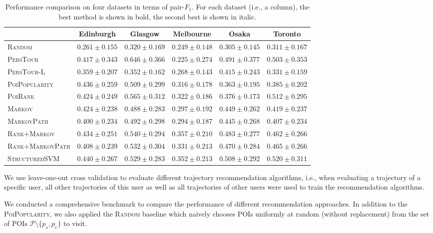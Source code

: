 \begin{table}[t]
\caption{Performance comparison on four datasets in terms of pair-$F_1$.
         For each dataset (i.e., a column), the best method is shown in bold, the second best is shown in italic.}
\label{tab:pairf1}
\centering
\begin{tabular}{l|ccccc} \hline
 & Edinburgh & Glasgow & Melbourne & Osaka & Toronto \\ \hline
\textsc{Random} & $0.261\pm0.155$ & $0.320\pm0.169$ & $0.249\pm0.148$ & $0.305\pm0.145$ & $0.311\pm0.167$ \\
\textsc{PersTour}\cite{ijcai15} & $0.417\pm0.343$ & $\mathbf{0.646\pm0.366}$ & $0.225\pm0.274$ & $\mathit{0.491\pm0.377}$ & $0.503\pm0.353$ \\
\textsc{PersTour-L} & $0.359\pm0.207$ & $0.352\pm0.162$ & $0.268\pm0.143$ & $0.415\pm0.243$ & $0.331\pm0.159$ \\
\textsc{PoiPopularity} & $\mathit{0.436\pm0.259}$ & $0.509\pm0.299$ & $0.316\pm0.178$ & $0.363\pm0.195$ & $0.385\pm0.202$ \\
\textsc{PoiRank} & $0.424\pm0.249$ & $\mathit{0.565\pm0.312}$ & $0.322\pm0.186$ & $0.376\pm0.173$ & $\mathit{0.512\pm0.295}$ \\
\textsc{Markov} & $0.424\pm0.238$ & $0.488\pm0.283$ & $0.297\pm0.192$ & $0.449\pm0.262$ & $0.419\pm0.237$ \\
\textsc{MarkovPath} & $0.400\pm0.234$ & $0.492\pm0.298$ & $0.294\pm0.187$ & $0.445\pm0.268$ & $0.407\pm0.234$ \\
\textsc{Rank+Markov} & $0.434\pm0.251$ & $0.540\pm0.294$ & $\mathbf{0.357\pm0.210}$ & $0.483\pm0.277$ & $0.462\pm0.266$ \\
\textsc{Rank+MarkovPath} & $0.408\pm0.239$ & $0.532\pm0.304$ & $0.331\pm0.213$ & $0.470\pm0.284$ & $0.465\pm0.266$ \\
\textsc{StructuredSVM} & $\mathbf{0.440\pm0.267}$ & $0.529\pm0.283$ & $\mathit{0.352\pm0.213}$ & $\mathbf{0.508\pm0.292}$ & $\mathbf{0.520\pm0.311}$ \\
\hline
\end{tabular}
\end{table}


We use leave-one-out cross validation to evaluate different trajectory recommendation algorithms,
i.e., when evaluating a trajectory of a specific user, all other trajectories of this user as well as
all trajectories of other users were used to train the recommendation algorithms.

We conducted a comprehensive benchmark to compare the performance of different recommendation approaches.
In addition to the \textsc{PoiPopularity}, we also applied the \textsc{Random} baseline which naively chooses
POIs uniformly at random (without replacement) from the set of POIs $\mathcal{P} \setminus \{p_s, p_e \}$ to visit.

